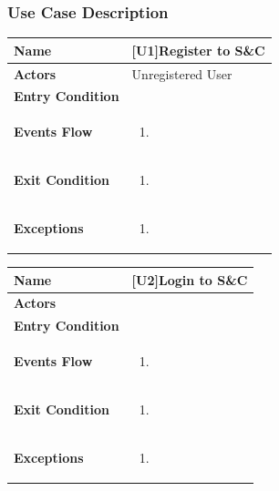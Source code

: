 \subsubsection{Use Case Description}
\begin{center}
    \begin{tabular}{|p{9em}|p{27em}|}
        \hline
        \rowcolor{bluepoli!40} %
        \textbf{Name} & \textbf{[U1]Register to S\&C} \\
        \hline
        \textbf{Actors} & Unregistered User \\
        \hline
        \textbf{Entry Condition} &  \\
        \hline
        \textbf{Events Flow} & 
        \begin{enumerate}
            \item 
        \end{enumerate} \\
        \hline
        \textbf{Exit Condition} & 
        \begin{enumerate}
            \item 
        \end{enumerate} \\
        \hline
        \textbf{Exceptions} &
        \begin{enumerate}
            \item
        \end{enumerate} \\
        \hline
    \end{tabular}
\end{center}

\begin{center}
    \begin{tabular}{|p{9em}|p{27em}|}
        \hline
        \rowcolor{bluepoli!40} %
        \textbf{Name} & \textbf{[U2]Login to S\&C} \\
        \hline
        \textbf{Actors} &  \\
        \hline
        \textbf{Entry Condition} &  \\
        \hline
        \textbf{Events Flow} & 
        \begin{enumerate}
            \item 
        \end{enumerate} \\
        \hline
        \textbf{Exit Condition} & 
        \begin{enumerate}
            \item 
        \end{enumerate} \\
        \hline
        \textbf{Exceptions} &
        \begin{enumerate}
            \item
        \end{enumerate} \\
        \hline
    \end{tabular}
\end{center}

